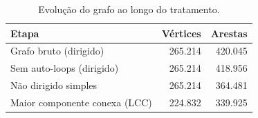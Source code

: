 \begin{table}[t]
  \caption{Evolução do grafo ao longo do tratamento.}
  \label{tab:tratamento}
\small
\begin{tabular}{lrr}
  \toprule
  Etapa & Vértices & Arestas \\
  \midrule
  Grafo bruto (dirigido) & 265.214 & 420.045 \\
  Sem auto-loops (dirigido) & 265.214 & 418.956 \\
  Não dirigido simples & 265.214 & 364.481 \\
  Maior componente conexa (LCC) & 224.832 & 339.925 \\
  \bottomrule
\end{tabular}
\end{table}
